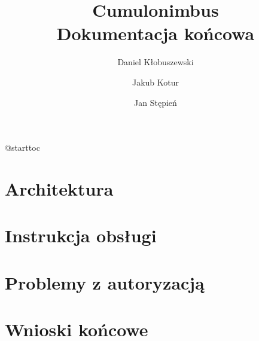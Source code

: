 

\usepackage{microtype}


\def\cb{Cumulonimbus}
\def\todo{\textbf{TODO}: }

\title{\cb{} \\ Dokumentacja końcowa}
\author{Daniel Kłobuszewski \and Jakub Kotur \and Jan Stępień}



\maketitle
\csname @starttoc

\section{Architektura}


\section{Instrukcja obsługi}


\section{Problemy z autoryzacją}


\section{Wnioski końcowe}






